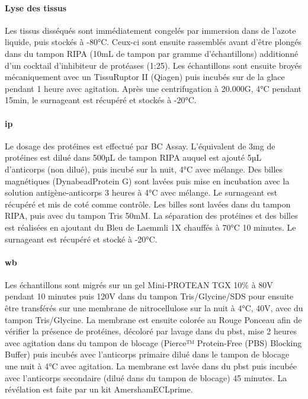 	\paragraph{Lyse des tissus}
	\label{par:lyse}
	Les tissus disséqués sont immédiatement congelés par immersion dans de l'azote liquide, puis stockés à -80°C. Ceux-ci sont ensuite rassemblés avant d'être plongés dans du tampon RIPA (10mL de tampon par gramme d'échantillons) additionné d'un cocktail d'inhibiteur de protéases (1:25). Les échantillons sont ensuite broyés mécaniquement avec un TissuRuptor II (Qiagen\textregistered) puis incubés sur de la glace pendant 1 heure avec agitation. Après une centrifugation à 20.000G, 4°C pendant 15min, le surnageant est récupéré et stockés à -20°C. 
	
	\paragraph{\Acrlong{ip}}
	\label{par:ip}
	Le dosage des protéines est effectué par BC Assay. L'équivalent de 3mg de protéines est dilué dans 500µL de tampon RIPA auquel est ajouté 5µL d'anticorps (non dilué), puis incubé sur la nuit, 4°C avec mélange. Des billes magnétiques (Dynabead\textregistered Protein G) sont lavées puis mise en incubation avec la solution antigène-anticorps 3 heures à 4°C avec mélange. Le surnageant est récupéré et mis de coté comme contrôle. Les billes sont lavées dans du tampon RIPA, puis avec du tampon Tris 50mM. La séparation des protéines et des billes est réalisées en ajoutant du Bleu de Laemmli 1X chauffés à 70°C 10 minutes. Le surnageant est récupéré et stocké à -20°C. 
	
	\paragraph{\Acrlong{wb}}
	\label{par:wb}
	Les échantillons sont migrés sur un gel Mini-PROTEAN\textregistered{}  TGX 10\% à 80V pendant 10 minutes puis 120V dans du tampon Tris/Glycine/SDS pour ensuite être transférés sur une membrane de nitrocellulose sur la nuit à 4°C, 40V, avec du tampon Tris/Glycine. La membrane est ensuite colorée au Rouge Ponceau afin de vérifier la présence de protéines, décoloré par lavage dans du \acrshort{pbst}, mise 2 heures avec agitation dans du tampon de blocage (Pierce™ Protein-Free (PBS) Blocking Buffer) puis incubés avec l'anticorps primaire dilué dans le tampon de blocage une nuit à 4°C avec agitation. La membrane est lavée dans du \acrshort{pbst} puis incubée avec l'anticorps secondaire (dilué dans du tampon de blocage) 45 minutes. La révélation est faite par un kit Amersham\texttrademark ECL\texttrademark prime.
		
